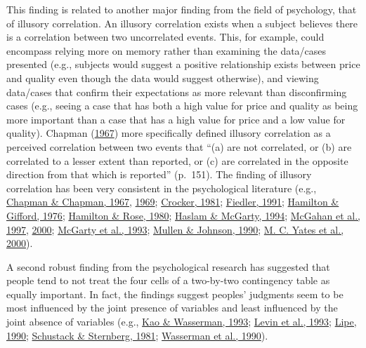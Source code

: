 \documentclass[11pt]{umnthesis}
\begin{document}
This finding is related to another major finding from the field of psychology, that of illusory correlation. An illusory correlation exists when a subject believes there is a correlation between two uncorrelated events. This, for example, could encompass relying more on memory rather than examining the data/cases presented (e.g., subjects would suggest a positive relationship exists between price and quality even though the data would suggest otherwise), and viewing data/cases that confirm their expectations as more relevant than disconfirming cases (e.g., seeing a case that has both a high value for price and quality as being more important than a case that has a high value for price and a low value for quality). Chapman (\protect\hyperlink{ref-chapman:1967}{1967}) more specifically defined illusory correlation as a perceived correlation between two events that ``(a) are not correlated, or (b) are correlated to a lesser extent than reported, or (c) are correlated in the opposite direction from that which is reported'' (p.~151). The finding of illusory correlation has been very consistent in the psychological literature (e.g., \protect\hyperlink{ref-chapman:1967a}{Chapman \& Chapman, 1967}, \protect\hyperlink{ref-chapman:1969}{1969}; \protect\hyperlink{ref-crocker:1981}{Crocker, 1981}; \protect\hyperlink{ref-fiedler:1991}{Fiedler, 1991}; \protect\hyperlink{ref-hamilton:1976}{Hamilton \& Gifford, 1976}; \protect\hyperlink{ref-hamilton:1980}{Hamilton \& Rose, 1980}; \protect\hyperlink{ref-haslam:1994}{Haslam \& McGarty, 1994}; \protect\hyperlink{ref-mcgahan:1997}{McGahan et al., 1997}, \protect\hyperlink{ref-mcgahan:2000}{2000}; \protect\hyperlink{ref-mcgarty:1993}{McGarty et al., 1993}; \protect\hyperlink{ref-mullen:1990}{Mullen \& Johnson, 1990}; \protect\hyperlink{ref-yates:2000}{M. C. Yates et al., 2000}).

A second robust finding from the psychological research has suggested that people tend to not treat the four cells of a two-by-two contingency table as equally important. In fact, the findings suggest peoples' judgments seem to be most influenced by the joint presence of variables and least influenced by the joint absence of variables (e.g., \protect\hyperlink{ref-kao:1993}{Kao \& Wasserman, 1993}; \protect\hyperlink{ref-levin:1993}{Levin et al., 1993}; \protect\hyperlink{ref-lipe:1990}{Lipe, 1990}; \protect\hyperlink{ref-schustack:1981}{Schustack \& Sternberg, 1981}; \protect\hyperlink{ref-wasserman:1990}{Wasserman et al., 1990}).
\end{document}
